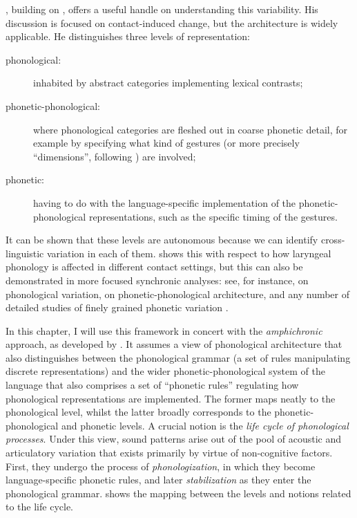 \documentclass[output=paper,colorlinks,citecolor=brown]{langscibook}
\begin{document}
\textcite{Natvig2019}, building on \textcite{purnell2015distinctive}, offers a useful handle on understanding this variability. His discussion is focused on contact\hyp induced change, but the architecture is widely applicable. He distinguishes three levels of representation:

\begin{description}
\item [phonological:] inhabited by abstract categories implementing lexical contrasts; 
\item [phonetic-phonological:] where phonological categories are fleshed out in coarse phonetic detail, for example by specifying what kind of gestures (or more precisely \enquote{dimensions}, following \citealt{avery01:_laryn}) are involved;
\item [phonetic:] having to do with the language-specific implementation of the phonetic\hyp phonological representations, such as the specific timing of the gestures.
\end{description}

It can be shown that these levels are autonomous because we can identify cross\hyp linguistic variation in each of them. \textcite{Natvig2019} shows this with respect to how laryngeal phonology is affected in different contact settings, but this can also be demonstrated in more focused synchronic analyses: see, for instance, \textcite{honeybone05} on phonological variation, \textcite{avery01:_laryn} on phonetic\hyp phonological architecture, and any number of detailed studies of finely grained phonetic variation \parencite[on English laryngeal systems, see, for example][]{docherty92:_britis_englis,scobbie06:_flexib_englis_vot,Jacewicz2009,docherty14:_languag_scott_englis,Sonderegger2020}.

In this chapter, I will use this framework in concert with the \emph{amphichronic} approach, as developed by \textcite{bermudez-diachr, bermúdez-otero2015amphichronic, rbo2012cycles}. It assumes a view of phonological architecture that also distinguishes between the phonological grammar (a set of rules manipulating discrete representations) and the wider phonetic\hyp phonological system of the language that also comprises a set of \enquote{phonetic rules} regulating how phonological representations are implemented. The former maps neatly to the phonological level, whilst the latter broadly corresponds to the phonetic\hyp phonological and phonetic levels. A crucial notion is the \emph{life cycle of phonological processes}. Under this view, sound patterns arise out of the pool of acoustic and articulatory variation that exists primarily by virtue of non\hyp cognitive factors. First, they undergo the process of \emph{phonologization}, in which they become language\hyp specific phonetic rules, and later \emph{stabilization} as they enter the phonological grammar.  shows the mapping between the levels and notions related to the life cycle.
\end{document}
